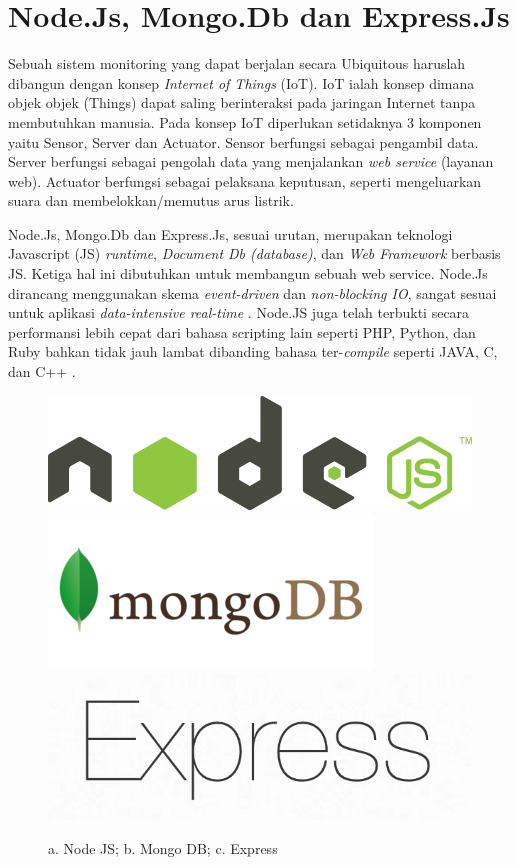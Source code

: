 \section{Node.Js, Mongo.Db dan Express.Js}
Sebuah sistem monitoring yang dapat berjalan secara Ubiquitous haruslah dibangun dengan konsep \textit{Internet of Things} (IoT). IoT ialah konsep dimana objek objek (Things) dapat saling berinteraksi pada jaringan Internet tanpa membutuhkan manusia. Pada konsep IoT diperlukan setidaknya 3 komponen yaitu Sensor, Server dan Actuator. Sensor berfungsi sebagai pengambil data. Server berfungsi sebagai pengolah data yang menjalankan \textit{web service} (layanan web). Actuator berfungsi sebagai pelaksana keputusan, seperti mengeluarkan suara dan membelokkan/memutus arus listrik.

Node.Js, Mongo.Db dan Express.Js, sesuai urutan, merupakan teknologi Javascript (JS) \textit{runtime}, \textit{Document Db  (database)}, dan \textit{Web Framework} berbasis JS. Ketiga hal ini dibutuhkan untuk membangun sebuah web service. Node.Js dirancang menggunakan skema \textit{event-driven} dan \textit{non-blocking IO}, sangat sesuai untuk aplikasi \textit{data-intensive real-time} \cite{nodejs}. Node.JS juga telah terbukti secara performansi lebih cepat dari bahasa scripting lain seperti PHP, Python, dan Ruby bahkan tidak jauh lambat dibanding bahasa ter-\textit{compile} seperti JAVA, C, dan C++ \cite{node_comparisson}.

\begin{figure}[H]
    \centering
	\includegraphics[scale=0.15]{images/nodejs.png}
    \includegraphics[scale=0.3]{images/mongodb.png}
	\includegraphics[scale=0.2]{images/express.png}
    \caption{a. Node JS; b. Mongo DB; c. Express}
\end{figure}

